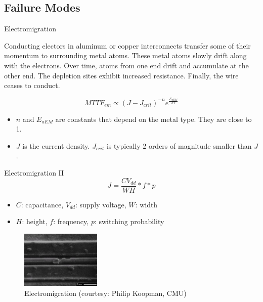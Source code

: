\documentclass[xcolor=pdftex,dvipsnames,table,svgnames,x11names]{beamer}
\begin{document}
\subsection{Failure Modes}
\begin{frame}{Electromigration}
 \begin{block}{}
Conducting electors in aluminum or copper interconnects transfer some of their momentum to surrounding
metal atoms. These metal atoms slowly drift along with the electrons. Over time, atoms from one end 
drift and accumulate at the other end. The depletion sites exhibit increased resistance. Finally, the
wire ceases to conduct.
\end{block}
\begin{displaymath}
 MTTF_{em} \propto (J - J_{crit})^{-n}e^{\frac{E_{aEM}}{kT}}
\end{displaymath}
\begin{itemize}
 \item $n$ and $E_{aEM}$ are constants that depend on the metal type. They are close to 1.
 \item $J$ is the current density. $J_{crit}$ is typically 2 orders of magnitude smaller than $J$. 
\end{itemize}

\end{frame}

\begin{frame}{Electromigration II}
 \begin{displaymath}
    J = \frac{CV_{dd}}{WH} * f * p 
\end{displaymath}
\begin{itemize}
 \item $C$: capacitance, $V_{dd}$: supply voltage, $W$: width
 \item $H$: height, $f$: frequency, $p$: switching probability
\end{itemize}
\begin{figure}[h]
\includegraphics[width=1.5in]{electromigration}
\caption{\footnotesize Electromigration (courtesy: Philip Koopman, CMU) }
\end{figure}
\end{frame}
\end{document}
